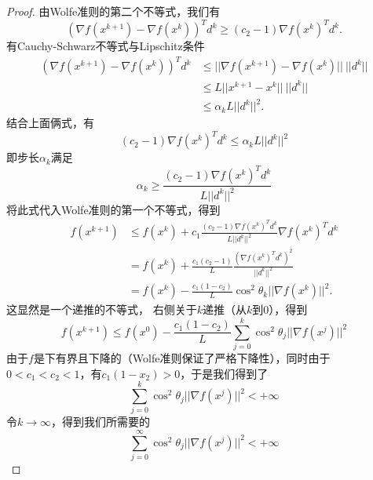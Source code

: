 \begin{proof}
	由Wolfe准则的第二个不等式，我们有
	\begin{equation*}
		(\nabla f(x^{k+1}) - \nabla f(x^k))^T d^k \geq (c_2 - 1)\nabla f(x^k)^Td^k.
	\end{equation*}
	有Cauchy-Schwarz不等式与Lipschitz条件
	\begin{equation*}
		\begin{split}
			(\nabla f(x^{k+1}) - \nabla f(x^k))^T d^k &\leq ||\nabla f(x^{k+1}) - \nabla f(x^k)||\ ||d^k||\\
			& \leq L||x^{k+1}-x^k||\ ||d^k||\\
			& \leq \alpha_k L ||d^k||^2.
		\end{split}
	\end{equation*}
	结合上面俩式，有
\begin{equation*}
	(c_2 - 1)\nabla f(x^k)^Td^k \leq \alpha_k L ||d^k||^2
\end{equation*}
即步长$\alpha_k$满足
\begin{equation*}
	\alpha_k \geq \frac{(c_2 - 1)\nabla f(x^k)^Td^k}{L ||d^k||^2}
\end{equation*}
将此式代入Wolfe准则的第一个不等式，得到
\begin{equation*}
	\begin{split}
		f(x^{k+1}) &\leq f(x^k) + c_1 \frac{(c_2 - 1)\nabla f(x^k)^Td^k}{L ||d^k||^2} \nabla f(x^k)^T d^k\\
		& = f(x^k)+\frac{c_1(c_2-1)}{L}\frac{(\nabla f(x^k)^T d^k)^2}{||d^k||^2}\\
		& = f(x^k)-\frac{c_1(1-c_2)}{L}\cos^2\theta_k ||\nabla f(x^k)||^2.
	\end{split}
\end{equation*}
这显然是一个递推的不等式， 右侧关于$k$递推（从$k$到$0$），得到
\begin{equation*}
	f(x^{k+1})\leq f(x^0)-\frac{c_1(1-c_2)}{L}\sum\limits_{j=0}^k\cos^2\theta_j ||\nabla f(x^j)||^2
\end{equation*}
由于$f$是下有界且下降的（Wolfe准则保证了严格下降性），同时由于$0<c_1<c_2<1$，有$c_1(1-x_2)>0$，于是我们得到了
\begin{equation*}
	\sum\limits_{j=0}^k\cos^2\theta_j ||\nabla f(x^j)||^2 < +\infty
\end{equation*}
令$k\to\infty$，得到我们所需要的
\begin{equation}\label{Zoutendijk}
	\sum\limits_{j=0}^\infty \cos^2\theta_j ||\nabla f(x^j)||^2 < +\infty
\end{equation}
\end{proof}
